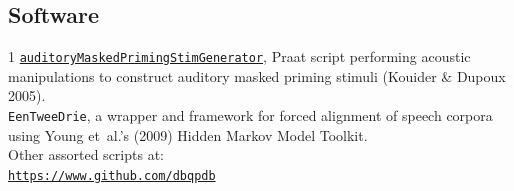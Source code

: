 \subsection*{Software}
\begin{hangparas}{\indentThisMuch}{1}
	\href{https://github.com/dbqpdb/auditoryMaskedPrimingStimGenerator}{\texttt{auditoryMaskedPrimingStimGenerator}}, Praat script performing acoustic manipulations to construct auditory masked priming stimuli (Kouider \& Dupoux 2005). \\

	\texttt{EenTweeDrie}, a wrapper and framework for forced alignment of speech corpora using Young et~al.'s (2009) Hidden Markov Model Toolkit. \\

	Other assorted scripts at: \\
    \href{https://www.github.com/dbqpdb}{\texttt{https://www.github.com/dbqpdb}}
\end{hangparas}

